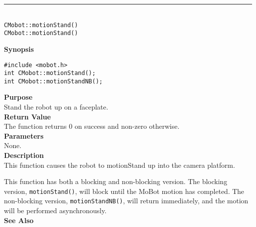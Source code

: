 \noindent
\vspace{5pt}
\rule{4.5in}{0.015in}\\
\noindent
{\LARGE \texttt{CMobot::motionStand()}}\\
{\LARGE \texttt{CMobot::motionStand()}}\\
{}

\noindent
{\bf Synopsis}\\
\begin{verbatim}
#include <mobot.h>
int CMobot::motionStand();
int CMobot::motionStandNB();
\end{verbatim}

\noindent
{\bf Purpose}\\
Stand the robot up on a faceplate.\\

\noindent
{\bf Return Value}\\
The function returns 0 on success and non-zero otherwise.\\

\noindent
{\bf Parameters}\\
None.\\

\noindent
{\bf Description}\\
This function causes the robot to motionStand up into the camera platform.

This function has both a blocking and non-blocking version.
The blocking version, \texttt{motionStand()}, will block until the
MoBot motion has completed. The non-blocking version, \texttt{motionStandNB()},
will return immediately, and the motion will be performed asynchronously.\\

\noindent
{\bf See Also}\\

